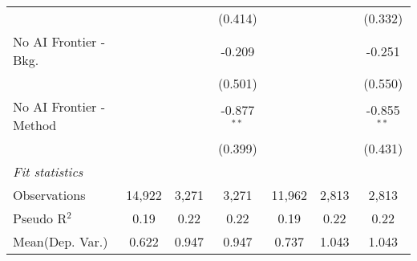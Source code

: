 \begin{tabular}{lcccccc}
                           &                &         & (0.414)       &                &         & (0.332)\\   
   No AI Frontier - Bkg.   &                &         & -0.209        &                &         & -0.251\\   
                           &                &         & (0.501)       &                &         & (0.550)\\   
   No AI Frontier - Method &                &         & -0.877$^{**}$ &                &         & -0.855$^{**}$\\   
                           &                &         & (0.399)       &                &         & (0.431)\\   
   \midrule
   \emph{Fit statistics}\\
   Observations            & 14,922         & 3,271   & 3,271         & 11,962         & 2,813   & 2,813\\  
   Pseudo R$^2$            & 0.19           & 0.22    & 0.22          & 0.19           & 0.22    & 0.22\\  
Mean(Dep. Var.) & 0.622 & 0.947 & 0.947 & 0.737 & 1.043 & 1.043 \\
   

\end{tabular}
